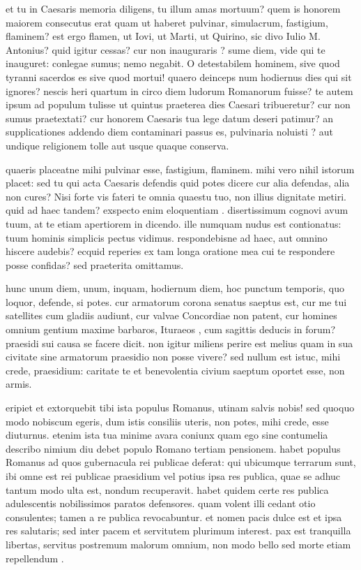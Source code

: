  et tu in Caesaris memoria diligens, tu illum amas mortuum? quem is honorem maiorem consecutus erat quam ut haberet pulvinar, simulacrum, fastigium, flaminem? est ergo flamen, ut Iovi, ut Marti, ut Quirino, sic divo Iulio M. Antonius? quid igitur cessas? cur non inauguraris ? sume diem, vide qui te inauguret: conlegae sumus; nemo negabit. O detestabilem hominem, sive quod tyranni sacerdos es sive quod mortui! quaero deinceps num hodiernus dies qui sit ignores? nescis heri quartum in circo diem ludorum Romanorum fuisse? te autem ipsum ad populum tulisse ut quintus praeterea dies Caesari tribueretur? cur non sumus praetextati? cur honorem Caesaris tua lege datum deseri patimur? an supplicationes addendo diem contaminari passus es, pulvinaria noluisti ? aut undique religionem tolle aut usque quaque conserva.

 quaeris placeatne mihi pulvinar esse, fastigium, flaminem. mihi vero nihil istorum placet: sed tu qui acta Caesaris defendis quid potes dicere cur alia defendas, alia non cures? Nisi forte vis fateri te omnia quaestu tuo, non illius dignitate metiri. quid ad haec tandem? exspecto enim eloquentiam . disertissimum cognovi avum tuum, at te etiam apertiorem in dicendo. ille numquam nudus est contionatus: tuum hominis simplicis pectus vidimus. respondebisne ad haec, aut omnino hiscere audebis? ecquid reperies ex tam longa oratione mea cui te respondere posse confidas? sed praeterita omittamus.

 hunc unum diem, unum, inquam, hodiernum diem, hoc punctum temporis, quo loquor, defende, si potes. cur armatorum corona senatus saeptus est, cur me tui satellites cum gladiis audiunt, cur valvae Concordiae non patent, cur homines omnium gentium maxime barbaros, Ituraeos , cum sagittis deducis in forum? praesidi sui causa se facere dicit. non igitur miliens perire est melius quam in sua civitate sine armatorum praesidio non posse vivere? sed nullum est istuc, mihi crede, praesidium: caritate te et benevolentia civium saeptum oportet esse, non armis.

 eripiet et extorquebit tibi ista populus Romanus, utinam salvis nobis! sed quoquo modo nobiscum egeris, dum istis consiliis uteris, non potes, mihi crede, esse diuturnus. etenim ista tua minime avara coniunx quam ego sine contumelia describo nimium diu debet populo Romano tertiam pensionem. habet populus Romanus ad quos gubernacula rei publicae deferat: qui ubicumque terrarum sunt, ibi omne est rei publicae praesidium vel potius ipsa res publica, quae se adhuc tantum modo ulta est, nondum recuperavit. habet quidem certe res publica adulescentis nobilissimos paratos defensores. quam volent illi cedant otio consulentes; tamen a re publica revocabuntur. et nomen pacis dulce est et ipsa res salutaris; sed inter pacem et servitutem plurimum interest. pax est tranquilla libertas, servitus postremum malorum omnium, non modo bello sed morte etiam repellendum .

